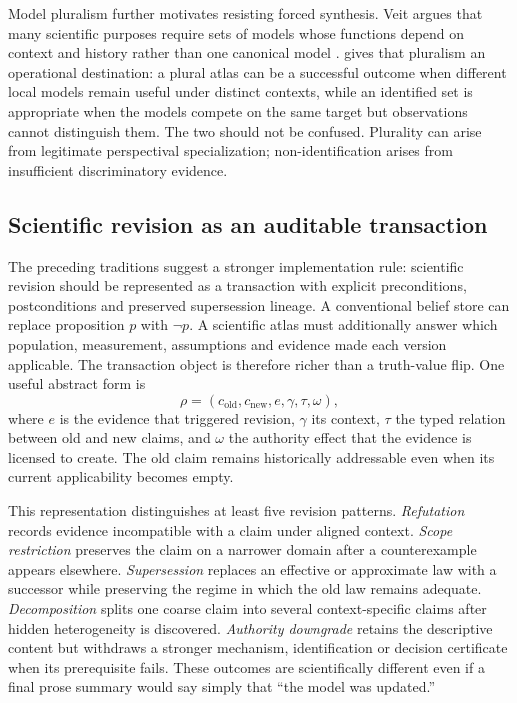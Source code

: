 Model pluralism further motivates resisting forced synthesis. Veit argues that many scientific purposes require sets of models whose functions depend on context and history rather than one canonical model \cite{veit2020pluralism}. \RAKL{} gives that pluralism an operational destination: a plural atlas can be a successful outcome when different local models remain useful under distinct contexts, while an identified set is appropriate when the models compete on the same target but observations cannot distinguish them. The two should not be confused. Plurality can arise from legitimate perspectival specialization; non-identification arises from insufficient discriminatory evidence.

\subsection{Scientific revision as an auditable transaction}

The preceding traditions suggest a stronger implementation rule: scientific revision should be represented as a transaction with explicit preconditions, postconditions and preserved supersession lineage. A conventional belief store can replace proposition \(p\) with \(\neg p\). A scientific atlas must additionally answer which population, measurement, assumptions and evidence made each version applicable. The transaction object is therefore richer than a truth-value flip. One useful abstract form is
\[
\rho=(c_{\mathrm{old}},c_{\mathrm{new}},e,\gamma,\tau,\omega),
\]
where \(e\) is the evidence that triggered revision, \(\gamma\) its context, \(\tau\) the typed relation between old and new claims, and \(\omega\) the authority effect that the evidence is licensed to create. The old claim remains historically addressable even when its current applicability becomes empty.

This representation distinguishes at least five revision patterns. \emph{Refutation} records evidence incompatible with a claim under aligned context. \emph{Scope restriction} preserves the claim on a narrower domain after a counterexample appears elsewhere. \emph{Supersession} replaces an effective or approximate law with a successor while preserving the regime in which the old law remains adequate. \emph{Decomposition} splits one coarse claim into several context-specific claims after hidden heterogeneity is discovered. \emph{Authority downgrade} retains the descriptive content but withdraws a stronger mechanism, identification or decision certificate when its prerequisite fails. These outcomes are scientifically different even if a final prose summary would say simply that ``the model was updated.''

